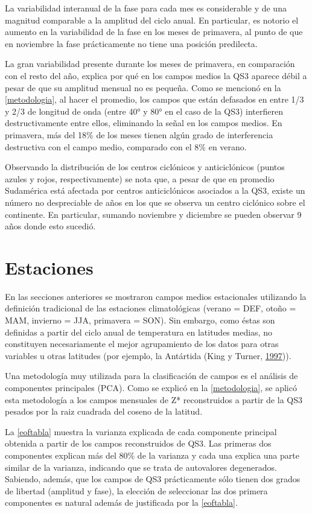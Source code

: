 \documentclass[spanish,a4paper,12pt]{book}
\begin{document}
La variabilidad interanual de la fase para cada mes es considerable y de
una magnitud comparable a la amplitud del ciclo anual. En particular, es
notorio el aumento en la variabilidad de la fase en los meses de
primavera, al punto de que en noviembre la fase prácticamente no tiene
una posición predilecta.

La gran variabilidad presente durante los meses de primavera, en
comparación con el resto del año, explica por qué en los campos medios
la QS3 aparece débil a pesar de que su amplitud mensual no es pequeña.
Como se mencionó en la \autoref{metodologia}, al hacer el promedio, los
campos que están defasados en entre 1/3 y 2/3 de longitud de onda (entre
40° y 80° en el caso de la QS3) interfieren destructivamente entre
ellos, eliminando la señal en los campos medios. En primavera, más del
18\% de los meses tienen algún grado de interferencia destructiva con el
campo medio, comparado con el 8\% en verano.

Observando la distribución de los centros ciclónicos y anticiclónicos
(puntos azules y rojos, respectivamente) se nota que, a pesar de que en
promedio Sudamérica está afectada por centros anticiclónicos asociados a
la QS3, existe un número no despreciable de años en los que se observa
un centro ciclónico sobre el continente. En particular, sumando
noviembre y diciembre se pueden observar 9 años donde esto sucedió.

\section{Estaciones}\label{estaciones}

En las secciones anteriores se mostraron campos medios estacionales
utilizando la definición tradicional de las estaciones climatológicas
(verano = DEF, otoño = MAM, invierno = JJA, primavera = SON). Sin
embargo, como éstas son definidas a partir del ciclo anual de
temperatura en latitudes medias, no constituyen necesariamente el mejor
agrupamiento de los datos para otras variables u otras latitudes (por
ejemplo, la Antártida (King y Turner,
\protect\hyperlink{ref-King1997}{1997})).

Una metodología muy utilizada para la clasificación de campos es el
análisis de componentes principales (PCA). Como se explicó en la
\autoref{metodologia}, se aplicó esta metodología a los campos mensuales
de Z* reconstruidos a partir de la QS3 pesados por la raiz cuadrada del
coseno de la latitud.

La \autoref{eoftabla} muestra la varianza explicada de cada componente
principal obtenida a partir de los campos reconstruidos de QS3. Las
primeras dos componentes explican más del 80\% de la varianza y cada una
explica una parte similar de la varianza, indicando que se trata de
autovalores degenerados. Sabiendo, además, que los campos de QS3
prácticamente sólo tienen dos grados de libertad (amplitud y fase), la
elección de seleccionar las dos primera componentes es natural además de
justificada por la \autoref{eoftabla}.
\end{document}
